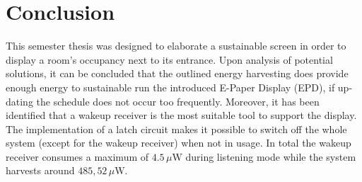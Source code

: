 \section*{Conclusion}
This semester thesis was designed to elaborate a sustainable screen in order to display a room’s occupancy next to its entrance. Upon analysis of potential solutions, it can be concluded that the outlined energy harvesting does provide enough energy to sustainable run the introduced E-Paper Display (EPD), if up-dating the schedule does not occur too frequently. Moreover, it has been identified that a wakeup receiver is the most suitable tool to support the display. The implementation of a latch circuit makes it possible to switch off the whole system (except for the wakeup receiver) when not in usage. In total the wakeup receiver consumes a maximum of $4.5\,\mu \text{W}$ during listening mode while the system harvests around $485,52\,\mu\text{W}$. 